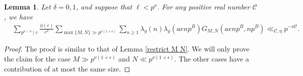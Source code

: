 \documentclass[12pt]{amsart}
\theoremstyle{plain}
\newtheorem{lem}{Lemma}[subsection]
\theoremstyle{definition}
\begin{document}


\begin{lem}\label{lem:extend MN}
Let $\delta=0, 1$, and suppose that $\ell < p^\nu$. For any positive real number $\mathcal C$, we have
    \begin{align*}
    &\sum_{p^{\nu-\delta} \mid c} \frac{\phi(c)}{c^2} 
    \sum_{\max\{M, N\} \gg p^{\nu(1+\epsilon)}}
    \sum_{n\geq 1}
    \lambda_g(n) \lambda_g(aenp^B) G_{M,N}(aenp^B, np^B)
    \ll_{ \mathcal C,\eta}   p^{-\nu \mathcal C} .
    \end{align*}
\end{lem}



\begin{proof}
The proof is similar to that of Lemma \ref{restrict M N}. We will only prove the claim for the case $M \gg p^{\nu(1+\epsilon)}$ and $N \ll p^{\nu(1+\epsilon)}$. The other cases have a contribution of at most the same size. 


\end{proof}
\end{document}
